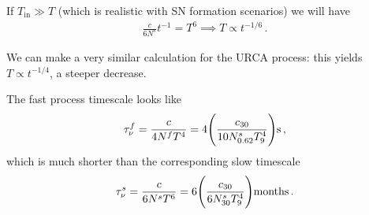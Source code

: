 \documentclass[main.tex]{subfiles}
\begin{document}
If \(T _{\text{in}} \gg T\) (which is realistic with SN formation scenarios) we will have 
%
\begin{align}
\frac{c}{6 N^{s}} t^{-1} = T^{6} \implies T \propto t^{-1/6}
\,.
\end{align}

We can make a very similar calculation for the URCA process: this yields  \(T \propto t^{-1/4}\), a steeper decrease. 

The fast process timescale looks like 
%
\begin{align}
\tau^f_\nu = \frac{c}{4 N^{f} T^{4}} = 4 \qty(\frac{c_{30}}{10 N^{s}_{\num{.62}} T^{4}_9}) \SI{}{s}
\,,
\end{align}
%
which is much shorter than the corresponding slow timescale 
%
\begin{align}
\tau^s_\nu = \frac{c}{6 N^{s} T^{6}}  = 6 \qty(\frac{c_{30}}{6 N_{30}^{s} T^{4}_9}) \SI{}{months}
\,.
\end{align}
\end{document}
